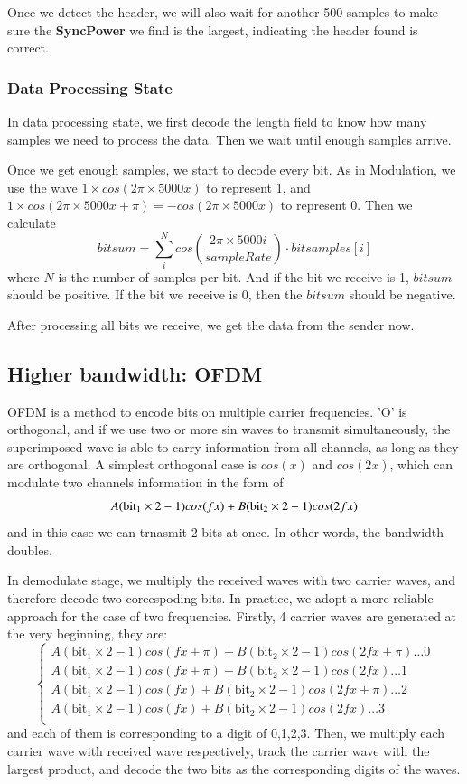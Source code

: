 \documentclass[11pt, conference]{IEEEtran}
\begin{document}
    Once we detect the header, we will also wait for another 500 samples to make sure the \textbf{SyncPower} we find is the largest, indicating the header found is correct.
\subsubsection{Data Processing State}
    In data processing state, we first decode the length field to know how many samples we need to process the data.
    Then we wait until enough samples arrive.

    Once we get enough samples, we start to decode every bit. As in Modulation, we use the wave $1 \times cos(2\pi \times 5000 x)$ to represent 1, and
    $  1 \times cos(2\pi \times 5000 x + \pi) = -cos(2\pi \times 5000 x)$ to represent 0. Then we calculate 
    $$bitsum = \sum_{i}^{N}cos(\frac{2\pi \times 5000 i}{sampleRate}) \cdot bitsamples[i] $$
    where $N$ is the number of samples per bit. And if the bit we receive is 1, $bitsum$ should be positive. If the bit we receive is 0, then the $bitsum$
    should be negative.

    After processing all bits we receive, we get the data from the sender now.
\subsection{Higher bandwidth: OFDM}

OFDM is a method to encode bits on multiple carrier frequencies. 'O' is orthogonal, and if we use two or more sin waves to transmit simultaneously,
the superimposed wave is able to carry information from all channels, as long as they are orthogonal. A simplest orthogonal case is $cos(x)$ and $cos(2x)$,
which can modulate two channels information in the form of 
\[
    A(\text{bit}_1 \times 2 - 1)cos(fx) + B(\text{bit}_2 \times 2 - 1)cos(2fx)\\
\]
and in this case we can trnasmit 2 bits at once. In other words, the bandwidth doubles. 

In demodulate stage, we multiply the received waves with two carrier waves, and therefore decode two coreespoding bits.
In practice, we adopt a more reliable approach for the case of two frequencies. Firstly, 4 carrier waves are generated at the
very beginning, they are:
\[
    \begin{cases}
    A(\text{bit}_1 \times 2 - 1)cos(fx+\pi) + B(\text{bit}_2 \times 2 - 1)cos(2fx + \pi) \dots 0 \\
    A(\text{bit}_1 \times 2 - 1)cos(fx+\pi) + B(\text{bit}_2 \times 2 - 1)cos(2fx) \dots 1\\
    A(\text{bit}_1 \times 2 - 1)cos(fx) + B(\text{bit}_2 \times 2 - 1)cos(2fx + \pi) \dots 2\\
    A(\text{bit}_1 \times 2 - 1)cos(fx) + B(\text{bit}_2 \times 2 - 1)cos(2fx) \dots 3\\
    \end{cases}
\]
and each of them is corresponding to a digit of 0,1,2,3. Then, we multiply each carrier wave with received wave respectively, track the carrier wave with the largest product, and decode the two
bits as the corresponding digits of the waves.
\end{document}
